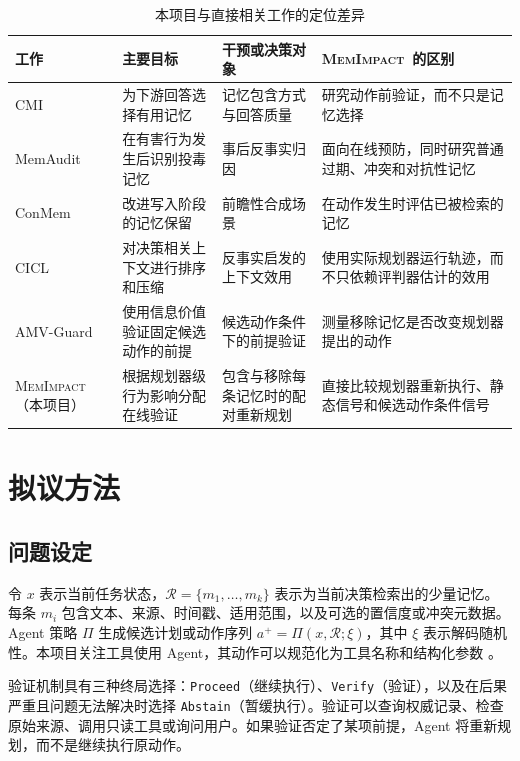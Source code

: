 \documentclass[11pt]{article}
\newcommand{\method}{\textsc{MemImpact}}
\newcommand{\R}{\mathcal{R}}
\begin{document}
\begin{table}[t]
\centering
\small
\caption{本项目与直接相关工作的定位差异}
\label{tab:related}
\begin{tabularx}{\textwidth}{>{\raggedright\arraybackslash}p{} >{\raggedright\arraybackslash}p{} >{\raggedright\arraybackslash}p{} >{\raggedright\arraybackslash}X}
\toprule
\textbf{工作} & \textbf{主要目标} & \textbf{干预或决策对象} & \textbf{\method\ 的区别} \\
\midrule
CMI \cite{srivastava2026cmi} & 为下游回答选择有用记忆 & 记忆包含方式与回答质量 & 研究动作前验证，而不只是记忆选择 \\
MemAudit \cite{tan2026memaudit} & 在有害行为发生后识别投毒记忆 & 事后反事实归因 & 面向在线预防，同时研究普通过期、冲突和对抗性记忆 \\
ConMem \cite{zhang2026conmem} & 改进写入阶段的记忆保留 & 前瞻性合成场景 & 在动作发生时评估已被检索的记忆 \\
CICL \cite{guan2026cicl} & 对决策相关上下文进行排序和压缩 & 反事实启发的上下文效用 & 使用实际规划器运行轨迹，而不只依赖评判器估计的效用 \\
AMV-Guard \cite{wang2026amv} & 使用信息价值验证固定候选动作的前提 & 候选动作条件下的前提验证 & 测量移除记忆是否改变规划器提出的动作 \\
\midrule
\method{}（本项目） & 根据规划器级行为影响分配在线验证 & 包含与移除每条记忆时的配对重新规划 & 直接比较规划器重新执行、静态信号和候选动作条件信号 \\
\bottomrule
\end{tabularx}
\end{table}

\section{拟议方法}

\subsection{问题设定}

令 $x$ 表示当前任务状态，$\R=\{m_1,\ldots,m_k\}$ 表示为当前决策检索出的少量记忆。每条 $m_i$ 包含文本、来源、时间戳、适用范围，以及可选的置信度或冲突元数据。Agent 策略 $\Pi$ 生成候选计划或动作序列 $a^{+}=\Pi(x,\R;\xi)$，其中 $\xi$ 表示解码随机性。本项目关注工具使用 Agent，其动作可以规范化为工具名称和结构化参数 \cite{yao2023react}。

验证机制具有三种终局选择：\texttt{Proceed}（继续执行）、\texttt{Verify}（验证），以及在后果严重且问题无法解决时选择 \texttt{Abstain}（暂缓执行）。验证可以查询权威记录、检查原始来源、调用只读工具或询问用户。如果验证否定了某项前提，Agent 将重新规划，而不是继续执行原动作。
\end{document}
